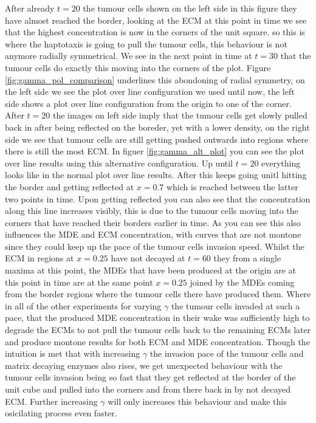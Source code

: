 After already $t=20$ the tumour cells shown on the left side in this figure they have almost reached the border, looking at the ECM at this point in time we see that the highest concentration is now in the corners of the unit square. so this is where the haptotaxis is going to pull the tumour cells, this behaviour is not anymore radially symmetrical. We see in the next point in time at $t=30$ that the tumour cells do exactly this moving into the corners of the plot. Figure \ref{fig:gamma_pol_comparison} underlines this abondoning of radial symmetry, on the left side we see the plot over line configuration we used until now, the left side shows a plot over line configuration from the origin to one of the corner. After $t=20$ the images on left side imply that the tumour cells get slowly pulled back in after being reflected on the boreder, yet with a lower density, on the right side we see that tumour cells are still getting pushed outwards into regions where there is still the most ECM. In figuer \ref{fig:gamma_alt_plot} you can see the plot over line results using this alternative configuration. Up until $t=20$ everything looks like in the normal plot over line results. After this keeps going unitl hitting the border and getting reflected at $x=0.7$ which is reached between the latter two points in time. Upon getting reflected you can also see that the concentration along this line increases visibly, this is due to the tumour cells moving into the corners that have reached their borders earlier in time. As you can see this also influences the MDE and ECM concentration, with curves that are not montone since they could keep up the pace of the tumour cells invasion speed. Whilst the ECM in regions at $x=0.25$ have not decayed at $t=60$ they from a single maxima at this point, the MDEs that have been produced at the origin are at this point in time are at the same point $x=0.25$ joined by the MDEs coming from the border regions where the tumour cells there have produced them.
Where in all of the other experiments for varying $\gamma$ the tumour cells invaded at such a pace, that the produced MDE concentration in their wake was sufficiently high to degrade the ECMs to not pull the tumour cells back to the remaining ECMs later and produce montone results for both ECM and MDE concentration.
Though the intuition is met that with increasing $\gamma$ the invasion pace of the tumour cells and matrix decaying enzymes also rises, we get unexpected behaviour with the tumour cells invasion being so fast that they get reflected at the border of the unit cube and pulled into the corners and from there back in by not decayed ECM. Further increasing $\gamma$ will only increases this behaviour and make this osicilating process even faster.

